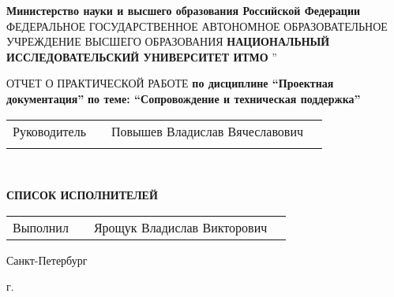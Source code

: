 \begin{titlepage}
    \begin{center}
        \textbf{Министерство науки и высшего образования Российской Федерации}
        \linebreak
        \textnormal{ФЕДЕРАЛЬНОЕ ГОСУДАРСТВЕННОЕ АВТОНОМНОЕ ОБРАЗОВАТЕЛЬНОЕ УЧРЕЖДЕНИЕ ВЫСШЕГО ОБРАЗОВАНИЯ}
        \textbf{НАЦИОНАЛЬНЫЙ ИССЛЕДОВАТЕЛЬСКИЙ УНИВЕРСИТЕТ ИТМО}
        \textquotedblright
        \linebreak
        \vspace{35mm}

        \textnormal{ОТЧЕТ О ПРАКТИЧЕСКОЙ РАБОТЕ}
        \linebreak
        \textbf{по дисциплине \enquote{Проектная документация}}
        \linebreak
        \textbf{по теме: \enquote{Сопровождение и техническая поддержка}}
        \linebreak
    \end{center}

        \vspace{35mm}
    \normalsize{
        \begin{tabular}{cccc}
            Руководитель & \underline{\hspace{3cm}} & Повышев Владислав Вячеславович \\\\
        \end{tabular}
    }\\
    \begin{center}
        \textbf{СПИСОК ИСПОЛНИТЕЛЕЙ}
    \end{center}

    \normalsize{
        \begin{tabular}{cccc}
            Выполнил & \underline{\hspace{3cm}} & Ярощук Владислав Викторович
        \end{tabular}
    }

    \begin{center}
        \vfill
        {Санкт-Петербург}
        \par{\the\year{} г.}
    \end{center}
\end{titlepage}
\restoregeometry
\addtocounter{page}{1}
